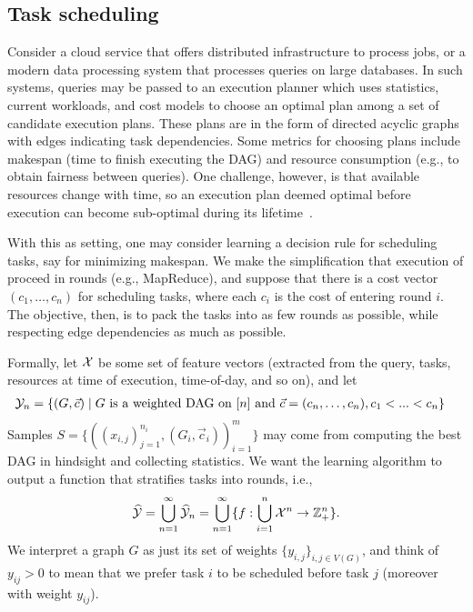 
\subsection{Task scheduling}
Consider a cloud service that offers distributed infrastructure to process
jobs, or a modern data processing system that processes queries on large
databases.
In such systems, queries may be passed to an execution planner
which uses statistics, current workloads, and cost models to choose an optimal
plan among a set of candidate execution plans.
These plans are in the form of directed acyclic graphs with edges indicating
task dependencies.
Some metrics for choosing plans include makespan (time to finish executing
the DAG) and resource consumption (e.g., to obtain fairness between queries).
One challenge, however, is that available resources change with time,
so an execution plan deemed optimal before execution can become sub-optimal
during its lifetime~\cite{mahajan2018qoop}.

With this as setting, one may consider learning a decision rule for
scheduling tasks, say for minimizing makespan. We make the simplification
that execution of proceed in rounds (e.g., MapReduce), and suppose that
there is a cost vector $(c_1, \ldots, c_n)$ for scheduling tasks, where
each $c_i$ is the cost of entering round $i$. The objective,
then, is to pack the tasks into as few rounds as possible, while respecting
edge dependencies as much as possible. 

Formally, let ${\mathcal X}$ be some set of feature vectors
(extracted from the query, tasks, resources at time of execution,
time-of-day, and so on), and let
\begin{align*}
  {\mathcal Y}_n &= \{ (G, \vec{c})
  \mid \text{$G$ is a weighted DAG on $[n]$
    and $\vec{c} =( c_n, \ldots, c_n), c_1 < ...< c_n$}
  \}
\end{align*}
Samples $S = \{((x_{i,j})_{j=1}^{n_i}, (G_i, \vec{c}_i))_{i=1}^m\}$ may come from
computing the best DAG in hindsight and collecting statistics. We want the
learning algorithm to output a function that stratifies tasks into rounds,
i.e.,
\begin{align*}
  \widehat{\mathcal{Y}} = \bigcup_{n=1}^\infty \widehat{\mathcal{Y}}_n
  = \bigcup_{n=1}^\infty \{f: \bigcup_{i=1}^n {\mathcal X}^n \to \mathbb{Z}_+^n\}.
\end{align*}
We interpret a graph $G$ as just its set of weights $\{y_{i,j}\}_{i,j \in V(G)}$,
and think of $y_{ij} > 0$ to mean that we prefer task $i$ to be scheduled before
task $j$ (moreover with weight $y_{ij}$).


